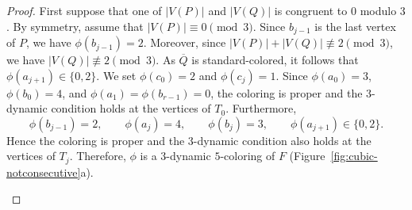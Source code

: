 \documentclass[a4paper,11pt]{article}
\providecommand{\tikzsetnextfilename}[1]{}
\theoremstyle{case}
\numberwithin{subcase}{case}
\begin{document}
\begin{proof}
First suppose that one of $|V(P)|$ and $|V(Q)|$ is congruent to $0$
modulo $3$. By symmetry, assume that $|V(P)|\equiv0\pmod3$.
Since $b_{j-1}$ is the last vertex of $P$, we have
$\phi(b_{j-1})=2$. Moreover, since
$|V(P)|+|V(Q)|\not\equiv2\pmod3$, we have
$|V(Q)|\not\equiv2\pmod3$. As $\overline{Q}$ is standard-colored,
it follows that $\phi(a_{j+1})\in\{0,2\}$.
We set $\phi(c_0)=2$ and $\phi(c_j)=1$. Since
$\phi(a_0)=3$, $\phi(b_0)=4$, and
$\phi(a_1)=\phi(b_{r-1})=0$, the coloring is proper and the
$3$-dynamic condition holds at the vertices of $T_0$.
Furthermore,
\[
\phi(b_{j-1})=2,\qquad
\phi(a_j)=4,\qquad
\phi(b_j)=3,\qquad
\phi(a_{j+1})\in\{0,2\}.
\]
Hence the coloring is proper and the $3$-dynamic condition also holds
at the vertices of $T_j$. Therefore, $\phi$ is a $3$-dynamic
$5$-coloring of $F$ (Figure~\ref{fig:cubic-notconsecutive}a).


\begin{figure}[H]
    \centering

    \begin{subfigure}{0.48\textwidth}
        \centering
\tikzsetnextfilename{fig-cubic-P0mod3}
\end{subfigure}
\end{figure}
\end{proof}
\end{document}
